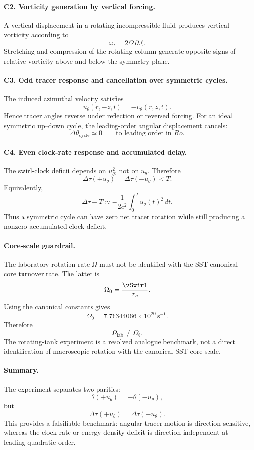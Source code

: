 \paragraph{C2. Vorticity generation by vertical forcing.}
A vertical displacement in a rotating incompressible fluid produces vertical
vorticity according to
\[
\boxed{
\omega_z=2\Omega\,\partial_z\xi.
}
\]
Stretching and compression of the rotating column generate opposite signs of
relative vorticity above and below the symmetry plane.

\paragraph{C3. Odd tracer response and cancellation over symmetric cycles.}
The induced azimuthal velocity satisfies
\[u_\theta(r,-z,t)=-u_\theta(r,z,t).
\]
Hence tracer angles reverse under reflection or reversed forcing.  For an ideal
symmetric up--down cycle, the leading-order angular displacement cancels:
\[
\boxed{
\Delta\theta_{\mathrm{cycle}}\simeq0
\qquad
\text{to leading order in }Ro.
}
\]

\paragraph{C4. Even clock-rate response and accumulated delay.}
The swirl-clock deficit depends on \(u_\theta^2\), not on \(u_\theta\).  Therefore
\[
\boxed{
\Delta\tau(+u_\theta)=\Delta\tau(-u_\theta)<T.
}
\]
Equivalently,
\[
\boxed{
\Delta\tau-T
\approx
-\frac{1}{2c^2}\int_0^Tu_\theta(t)^2\,dt.
}
\]
Thus a symmetric cycle can have zero net tracer rotation while still producing a
nonzero accumulated clock deficit.

\paragraph{Core-scale guardrail.}
The laboratory rotation rate \(\Omega\) must not be identified with the SST
canonical core turnover rate.  The latter is
\[
\Omega_0=\frac{\vSwirl}{r_c}.
\]
Using the canonical constants gives
\[
\boxed{
\Omega_0=7.76344066\times10^{20}\,\mathrm{s^{-1}}.
}
\]
Therefore
\[
\boxed{
\Omega_{\mathrm{lab}}\neq\Omega_0.
}
\]
The rotating-tank experiment is a resolved analogue benchmark, not a direct
identification of macroscopic rotation with the canonical SST core scale.

\paragraph{Summary.}
The experiment separates two parities:
\[
\boxed{
\theta(+u_\theta)=-\theta(-u_\theta),
}
\]
but
\[
\boxed{
\Delta\tau(+u_\theta)=\Delta\tau(-u_\theta).
}
\]
This provides a falsifiable benchmark: angular tracer motion is direction
sensitive, whereas the clock-rate or energy-density deficit is direction
independent at leading quadratic order.

